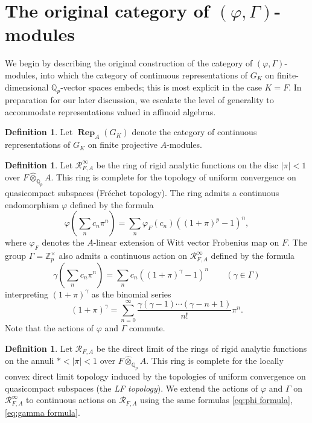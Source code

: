 \documentclass[12pt]{amsart}
\theoremstyle{definition}
\newtheorem{defn}[theorem]{Definition}
\numberwithin{equation}{theorem}
\newcommand{\QQ}{\mathbb{Q}}
\newcommand{\ZZ}{\mathbb{Z}}
\newcommand{\calR}{\mathcal{R}}
\DeclareMathOperator{\Rep}{\mathbf{Rep}}
\begin{document}
\section{The original category of $(\varphi, \Gamma)$-modules}
\label{sec:categories}

We begin by describing the original construction of the category of $(\varphi, \Gamma)$-modules,
into which the category of continuous representations of $G_K$ on finite-dimensional $\QQ_p$-vector spaces embeds; this is most explicit in the case $K=F$.
In preparation for our later discussion, we escalate the level of generality to accommodate representations valued in affinoid algebras.

\begin{defn}
Let $\Rep_A(G_K)$ denote the category of continuous representations of $G_K$ on finite projective $A$-modules.
\end{defn}

\begin{defn}
Let $\calR^\infty_{F,A}$ be the ring of rigid analytic functions on the disc $\left| \pi \right| < 1$ over $F \widehat{\otimes}_{\QQ_p} A$. This ring is complete for the topology of uniform convergence on quasicompact subspaces (Fr\'echet topology). The ring admits a continuous endomorphism $\varphi$ defined by the formula
\begin{equation} \label{eq:phi formula}
\varphi \left( \sum_n c_n \pi^n \right) =  \sum_n \varphi_F(c_n) ((1 + \pi)^p-1)^n,
\end{equation}
where $\varphi_F$ denotes the $A$-linear extension of Witt vector Frobenius map on $F$.
The group $\Gamma = \ZZ_p^\times$ also admits a continuous action on $\calR^\infty_{F,A}$ defined by the formula
\begin{equation} \label{eq:gamma formula}
\gamma \left( \sum_n c_n \pi^n \right) = \sum_n c_n ((1 + \pi)^\gamma-1)^n \qquad (\gamma \in \Gamma)
\end{equation}
interpreting $(1 + \pi)^\gamma$ as the binomial series 
\[
(1 + \pi)^\gamma = \sum_{n=0}^\infty \frac{\gamma(\gamma-1)\cdots (\gamma-n+1)}{n!} \pi^n.
\]
Note that the actions of $\varphi$ and $\Gamma$ commute.
\end{defn}

\begin{defn}
Let $\calR_{F,A}$ be the direct limit of the rings of rigid analytic functions on the annuli $* < \left| \pi \right| < 1$ over $F \widehat{\otimes}_{\QQ_p} A$. This ring is complete for the locally convex direct limit topology induced by the topologies of uniform convergence on quasicompact subspaces (the \emph{LF topology}). We extend the actions of $\varphi$ and $\Gamma$ on $\calR^\infty_{F,A}$ to continuous actions on $\calR_{F,A}$ using the same formulas \eqref{eq:phi formula}, \eqref{eq:gamma formula}.
\end{defn}
\end{document}
